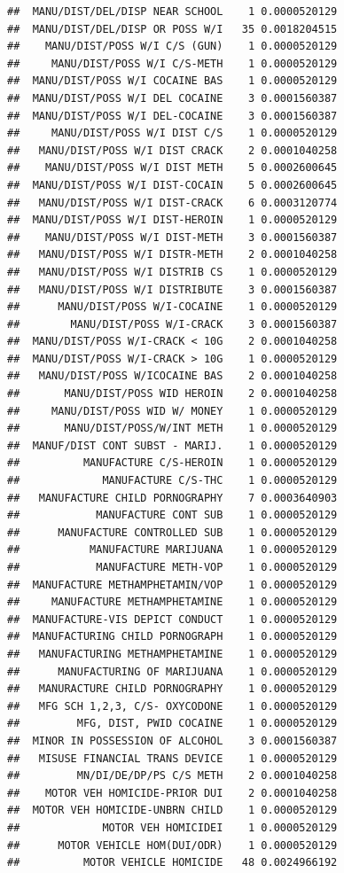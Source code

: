 \documentclass[]{book}
\begin{document}
\begin{verbatim}
##  MANU/DIST/DEL/DISP NEAR SCHOOL    1 0.0000520129
##  MANU/DIST/DEL/DISP OR POSS W/I   35 0.0018204515
##    MANU/DIST/POSS W/I C/S (GUN)    1 0.0000520129
##     MANU/DIST/POSS W/I C/S-METH    1 0.0000520129
##  MANU/DIST/POSS W/I COCAINE BAS    1 0.0000520129
##  MANU/DIST/POSS W/I DEL COCAINE    3 0.0001560387
##  MANU/DIST/POSS W/I DEL-COCAINE    3 0.0001560387
##     MANU/DIST/POSS W/I DIST C/S    1 0.0000520129
##   MANU/DIST/POSS W/I DIST CRACK    2 0.0001040258
##    MANU/DIST/POSS W/I DIST METH    5 0.0002600645
##  MANU/DIST/POSS W/I DIST-COCAIN    5 0.0002600645
##   MANU/DIST/POSS W/I DIST-CRACK    6 0.0003120774
##  MANU/DIST/POSS W/I DIST-HEROIN    1 0.0000520129
##    MANU/DIST/POSS W/I DIST-METH    3 0.0001560387
##   MANU/DIST/POSS W/I DISTR-METH    2 0.0001040258
##   MANU/DIST/POSS W/I DISTRIB CS    1 0.0000520129
##   MANU/DIST/POSS W/I DISTRIBUTE    3 0.0001560387
##      MANU/DIST/POSS W/I-COCAINE    1 0.0000520129
##        MANU/DIST/POSS W/I-CRACK    3 0.0001560387
##  MANU/DIST/POSS W/I-CRACK < 10G    2 0.0001040258
##  MANU/DIST/POSS W/I-CRACK > 10G    1 0.0000520129
##   MANU/DIST/POSS W/ICOCAINE BAS    2 0.0001040258
##       MANU/DIST/POSS WID HEROIN    2 0.0001040258
##     MANU/DIST/POSS WID W/ MONEY    1 0.0000520129
##       MANU/DIST/POSS/W/INT METH    1 0.0000520129
##  MANUF/DIST CONT SUBST - MARIJ.    1 0.0000520129
##          MANUFACTURE C/S-HEROIN    1 0.0000520129
##             MANUFACTURE C/S-THC    1 0.0000520129
##   MANUFACTURE CHILD PORNOGRAPHY    7 0.0003640903
##            MANUFACTURE CONT SUB    1 0.0000520129
##      MANUFACTURE CONTROLLED SUB    1 0.0000520129
##           MANUFACTURE MARIJUANA    1 0.0000520129
##            MANUFACTURE METH-VOP    1 0.0000520129
##  MANUFACTURE METHAMPHETAMIN/VOP    1 0.0000520129
##     MANUFACTURE METHAMPHETAMINE    1 0.0000520129
##  MANUFACTURE-VIS DEPICT CONDUCT    1 0.0000520129
##  MANUFACTURING CHILD PORNOGRAPH    1 0.0000520129
##   MANUFACTURING METHAMPHETAMINE    1 0.0000520129
##      MANUFACTURING OF MARIJUANA    1 0.0000520129
##   MANURACTURE CHILD PORNOGRAPHY    1 0.0000520129
##   MFG SCH 1,2,3, C/S- OXYCODONE    1 0.0000520129
##         MFG, DIST, PWID COCAINE    1 0.0000520129
##  MINOR IN POSSESSION OF ALCOHOL    3 0.0001560387
##   MISUSE FINANCIAL TRANS DEVICE    1 0.0000520129
##         MN/DI/DE/DP/PS C/S METH    2 0.0001040258
##    MOTOR VEH HOMICIDE-PRIOR DUI    2 0.0001040258
##  MOTOR VEH HOMICIDE-UNBRN CHILD    1 0.0000520129
##             MOTOR VEH HOMICIDEI    1 0.0000520129
##      MOTOR VEHICLE HOM(DUI/ODR)    1 0.0000520129
##          MOTOR VEHICLE HOMICIDE   48 0.0024966192

\end{verbatim}
\end{document}
